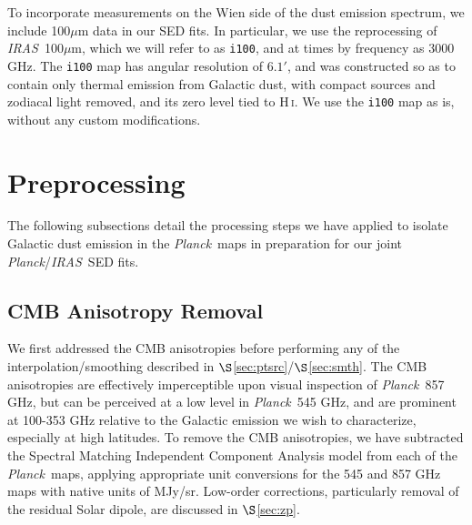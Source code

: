 \documentclass{emulateapj}
\newcommand{\IRAS}{{\it IRAS}}
\newcommand{\PLANCK}{{\it Planck}}
\begin{document}
To incorporate measurements on the Wien side of the dust emission spectrum, 
we include 100$\mu$m data in our SED fits. In particular, we use the 
\citet[henceforth SFD]{SFD} reprocessing of \IRAS~100$\mu$m, which we will 
refer to as \verb|i100|, and at times by frequency as 3000 GHz. The \verb|i100|
 map has angular resolution of $6.1'$, and was constructed so as to contain 
only thermal emission from Galactic dust, with compact sources and zodiacal 
light removed, and its zero level tied to H\,\textsc{i}. We use the \verb|i100|
map as is, without any custom modifications.

\section{Preprocessing}
\label{sec:prepro}

The following subsections detail the processing steps we have applied to 
isolate Galactic dust emission in the \PLANCK~maps in preparation for our joint
\PLANCK/\IRAS~SED fits. %

\subsection{CMB Anisotropy Removal}
\label{sec:cmb}
We first addressed the CMB anisotropies before performing any of the 
interpolation/smoothing described in $\S$\ref{sec:ptsrc}/$\S$\ref{sec:smth}. 
The CMB anisotropies are effectively imperceptible upon visual inspection 
of \PLANCK~857 GHz, but can be perceived at a low level in \PLANCK~545 GHz, and
are prominent at 100-353 GHz relative to the Galactic emission
we wish to characterize, especially at high latitudes. To remove the CMB 
anisotropies, we have subtracted the Spectral Matching Independent Component 
Analysis \citep[SMICA,][]{smica} model from each of the \PLANCK~maps, 
applying appropriate unit conversions for the 545 and 857 GHz maps with native 
units of MJy/sr. Low-order corrections, particularly removal of the residual 
Solar dipole, are discussed in $\S$\ref{sec:zp}.

\end{document}
